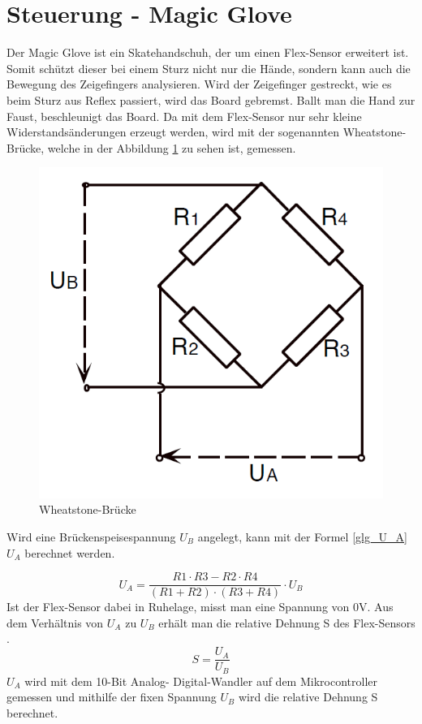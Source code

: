 \section{Steuerung - Magic Glove}
\label{HW_MagicGlove}
Der Magic Glove ist ein Skatehandschuh, der um einen Flex-Sensor erweitert ist. Somit schützt dieser bei einem Sturz nicht nur die Hände, sondern kann auch die Bewegung des Zeigefingers analysieren. Wird der Zeigefinger gestreckt, wie es beim Sturz aus Reflex passiert, wird das Board gebremst. Ballt man die Hand zur Faust, beschleunigt das Board.
Da mit dem Flex-Sensor nur sehr kleine Widerstandsänderungen erzeugt werden, wird mit der sogenannten Wheatstone-Brücke, welche in der Abbildung \ref{fig:wheatstonebruecke} zu sehen ist, gemessen.
\begin{figure} [H]
	\centering
	\includegraphics[width=.45\linewidth]{images/wheatstone_Bruecke}
	\caption{Wheatstone-Brücke}
	\label{fig:wheatstonebruecke}
\end{figure}
Wird eine Brückenspeisespannung $U_B$ angelegt, kann mit der Formel \ref{glg_U_A} $U_A$ berechnet werden\cite{Looser_Kraftmessung}. 

\begin{equation}\label{glg_U_A}
 U_A=\frac{R1 \cdot R3-R2 \cdot R4}{(R1+R2) \cdot (R3+R4)} \cdot U_B 
\end{equation}
Ist der Flex-Sensor dabei in Ruhelage, misst man eine Spannung von 0V. Aus dem Verhältnis von $ U_A $ zu $ U_B $ erhält man die relative Dehnung S des Flex-Sensors \cite{Looser_Kraftmessung}.
\begin{equation}\label{S_relativeDehnung}
S=\frac{U_A}{U_B}
\end{equation}
$U_A$ wird mit dem 10-Bit Analog- Digital-Wandler auf dem Mikrocontroller gemessen und mithilfe der fixen Spannung $U_B$ wird die relative Dehnung S berechnet. 


